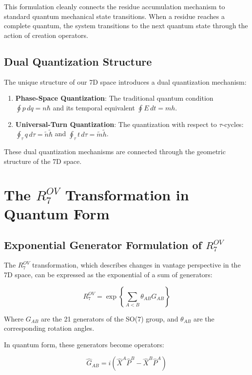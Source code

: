\documentclass{article}
\begin{document}
This formulation cleanly connects the residue accumulation mechanism to standard quantum mechanical state transitions. When a residue reaches a complete quantum, the system transitions to the next quantum state through the action of creation operators.

\subsection{Dual Quantization Structure}

The unique structure of our 7D space introduces a dual quantization mechanism:

\begin{enumerate}
\item \textbf{Phase-Space Quantization}: The traditional quantum condition $\oint p \, dq = n\hbar$ and its temporal equivalent $\oint E \, dt = mh$.
\item \textbf{Universal-Turn Quantization}: The quantization with respect to $\tau$-cycles: $\oint_\tau q \, d\tau = \tilde{n}\tilde{\hbar}$ and $\oint_\tau t \, d\tau = \tilde{m}\tilde{h}$.
\end{enumerate}

These dual quantization mechanisms are connected through the geometric structure of the 7D space.

\section{The $R^{OV}_7$ Transformation in Quantum Form}

\subsection{Exponential Generator Formulation of $R^{OV}_7$}

The $R^{OV}_7$ transformation, which describes changes in vantage perspective in the 7D space, can be expressed as the exponential of a sum of generators:

\begin{equation}
R^{OV}_7 = \exp\left\{\sum_{A<B} \theta_{AB} G_{AB}\right\}
\end{equation}

Where $G_{AB}$ are the 21 generators of the SO(7) group, and $\theta_{AB}$ are the corresponding rotation angles.

In quantum form, these generators become operators:

\begin{equation}
\hat{G}_{AB} = i(\hat{X}^A \hat{P}^B - \hat{X}^B \hat{P}^A)
\end{equation}
\end{document}
